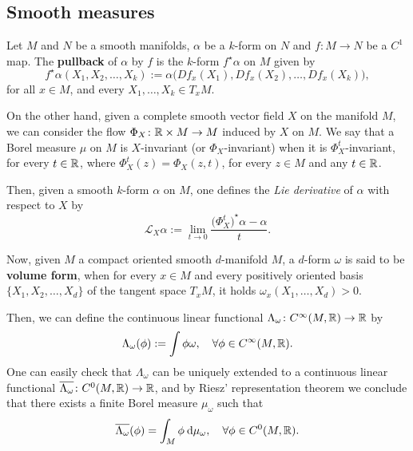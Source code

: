 \subsection{Smooth measures}\label{sec:smooth-measures}

Let $M$ and $N$ be a smooth manifolds, $\alpha$ be a $k$-form on $N$ and $f\colon M\to N$ be a $C^{1}$ map. The \textbf{pullback} of $\alpha$ by $f$ is the $k$-form $f^{\star}\alpha$ on $M$ given by
\begin{displaymath}
  f^{\star}\alpha(X_{1},X_{2},\ldots,X_{k}):= \alpha\big(Df_{x}(X_{1}),Df_{x}(X_{2}),\ldots,Df_{x}(X_{k})\big),
\end{displaymath}
for all $x\in M$, and every $X_{1},\ldots,X_{k}\in T_{x} M$.

On the other hand, given a complete smooth vector field $X$ on the manifold $M$, we can consider the flow $\Phi_{X}\colon\mathbb{R}\times M\to M$ induced by $X$ on $M$. We say that a Borel measure $\mu$ on $M$ is $X$-invariant (or $\Phi_{X}$-invariant) when it is $\Phi_{X}^{t}$-invariant, for every $t\in\mathbb{R}$, where $\Phi_{X}^{t}(z)=\Phi_{X}(z,t)$, for every $z\in M$ and any $t\in\mathbb{R}$.

Then, given a smooth $k$-form $\alpha$ on $M$, one defines the \emph{Lie derivative} of $\alpha$ with respect to $X$ by
\begin{equation}
  \label{eq:Lie-derivative-def}
  \mathcal{L}_{X}\alpha := \lim_{t\to 0} \frac{{\big(\Phi_{X}^{t}\big)}^{\star}\alpha-\alpha}{t}.
\end{equation}

Now, given $M$ a compact oriented smooth $d$-manifold $M$, a $d$-form $\omega$ is said to be \textbf{volume form}, when for every $x\in M$ and every positively oriented basis $\{X_{1}, X_{2},\ldots , X_{d}\}$ of the tangent space $T_{x}M$, it holds $\omega_x(X_{1},\ldots,X_{d})>0$.

Then, we can define the continuous linear functional $\Lambda_{\omega}\colon C^{\infty}(M,\mathbb{R})\to\mathbb{R}$ by
\begin{displaymath}
  \Lambda_{\omega}(\phi):=\int \phi\omega, \quad\forall \phi\in C^{\infty}(M,\mathbb{R}).
\end{displaymath}
One can easily check that $\Lambda_{\omega}$ can be uniquely extended to a continuous linear functional $\overline{\Lambda_{\omega}}\colon C^{0}(M,\mathbb{R})\to\mathbb{R}$, and by Riesz' representation theorem we conclude that there exists a finite Borel measure $\mu_{\omega}$ such that
\begin{displaymath}
  \overline{\Lambda_{\omega}}(\phi) = \int_{M}\phi\:\mathrm{d}\mu_{\omega}, \quad\forall \phi\in C^{0}(M,\mathbb{R}).
\end{displaymath}

